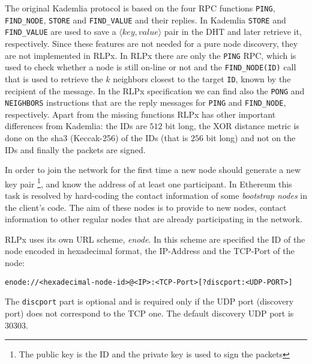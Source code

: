 The original Kademlia protocol is based on the four RPC functions
\verb|PING|, \verb|FIND_NODE|,
\verb|STORE| and \verb|FIND_VALUE| and their replies.
In Kademlia \verb|STORE| and \verb|FIND_VALUE| are used to save a
$\langle key, value\rangle$ pair in the DHT and later retrieve it, respectively.
Since these features are not needed for a pure node discovery, they
are not implemented in RLPx.
In RLPx there are only the \verb|PING| RPC, which is used to check whether a
node is still on-line or not and the \verb|FIND_NODE(ID)| call that is used to
retrieve the $k$ neighbors closest to the target \verb|ID|, known by the
recipient of the message. In the RLPx specification we can find also
the \verb|PONG| and \verb|NEIGHBORS| instructions that are the reply messages
for \verb|PING| and \verb|FIND_NODE|, respectively.
Apart from the missing functions RLPx has other important differences
from Kademlia:
the IDs are $512$ bit long, the XOR distance metric is done on the sha3
(Keccak-256) of the IDs (that is $256$ bit long) and not on the IDs and
finally the packets are signed.

In order to join the network for the first time a new node should
generate a new key pair
\footnote{The public key is the ID and the private key is used to sign the packets}, and
know the address of at least one participant.
In Ethereum this task is resolved by hard-coding the contact information
of some \textit{bootstrap nodes} in the client's code.
The aim of these nodes is to provide to new nodes, contact information to
other regular nodes that are already participating in the network.

RLPx uses its own URL scheme, \emph{enode}.
In this scheme are specified the ID of the node encoded in hexadecimal format,
the IP-Address and the TCP-Port of the node:
\begin{verbatim}
enode://<hexadecimal-node-id>@<IP>:<TCP-Port>[?discport:<UDP-PORT>]
\end{verbatim}
The \verb|discport| part is optional and is required only if the
UDP port (discovery port) does not correspond to the TCP one.
The default discovery UDP port is 30303.


